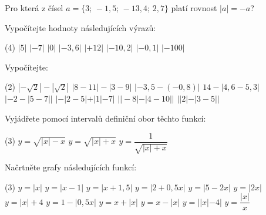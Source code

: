 \documentclass[12pt,a4paper]{article}
\begin{document}

\exercisepart
\setcounter{section}{1} %


\begin{exercise}[Kdy platí $|a|=-a$]
    Pro která z čísel $a=\{3;\,-1{,}5;\,-13{,}4;\,2{,}7\}$ platí rovnost $|a|=-a$?
\end{exercise}


\begin{exercise}
    Vypočítejte hodnoty následujících výrazů:
    \begin{tasks}(4)
        \task $|5|$
        \task $|-7|$
        \task $|0|$
        \task $|-3{,}6|$
        \task $|+12|$
        \task $|-10{,}2|$
        \task $|-0{,}1|$
        \task $|-100|$
    \end{tasks}
\end{exercise}


\begin{exercise}
    Vypočítejte:
    \begin{tasks}(2)
        \task $|-\sqrt{2}| - |\sqrt{2}|$
        \task $|8-11| - |3-9|$
        \task $|-3{,}5 - (-0{,}8)|$
        \task $14 - |4{,}6 - 5{,}3|$
        \task $|-2 - |5-7||$
        \task $|-|2-5| + |1| - 7|$
        \task $||-8| - |4-10||$
        \task $||2| - |3-5||$
    \end{tasks}
\end{exercise}


\begin{exercise}
    Vyjádřete pomocí intervalů definiční obor těchto funkcí:
    \begin{tasks}(3)
        \task $y=\sqrt{|x|-x}$
        \task $y=\sqrt{|x|+x}$
        \task $y=\dfrac{1}{\sqrt{|x|+x}}$
    \end{tasks}
\end{exercise}


\begin{exercise}
    Načrtněte grafy následujících funkcí:
    \begin{tasks}(3)
        \task $y=|x|$
        \task $y=|x-1|$
        \task $y=|x+1{,}5|$
        \task $y=|2+0{,}5x|$
        \task $y=|5-2x|$
        \task $y=|2x|$
        \task $y=|x|+4$
        \task $y=1-|0{,}5x|$
        \task $y=x+|x|$
        \task $y=x-|x|$
        \task $y=||x|-4|$
        \task $y=\dfrac{|x|}{x}$
    \end{tasks}
\end{exercise}
\end{document}
